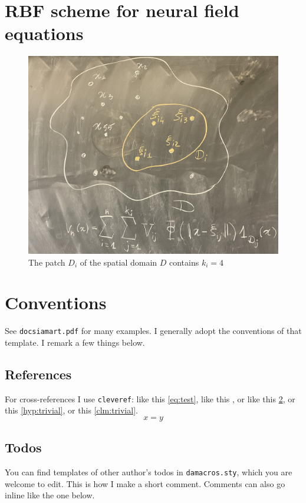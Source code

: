 \documentclass[a4paper]{siamart190516}
\begin{document}
\section{RBF scheme for neural field equations}\label{sec:RBFScheme} 
\begin{figure}
  \centering
  \includegraphics[width=\textwidth]{sketch}
  \caption{The patch $D_i$ of the spatial domain $D$ contains $k_i =4$}
  \label{fig:sketch}
\end{figure}

\section{Conventions} \label{sec:conventions}
See \texttt{docsiamart.pdf} for many examples. I generally adopt the conventions of
that template. I remark a few things below.

\subsection{References} \label{sec:references} For cross-references I use
\texttt{cleveref}: like this
\cref{eq:test}, like this , or like this \cref{sec:conventions}, or
this \cref{hyp:trivial}, or this \cref{clm:trivial}.
\begin{equation}\label{eq:test}
  x = y
\end{equation}

\subsection{Todos}
You can find templates of other author's todos in
\texttt{damacros.sty}, which you are welcome to edit.
This is how I make a short comment. Comments can also go
inline like the one below.
% 
\end{document}

